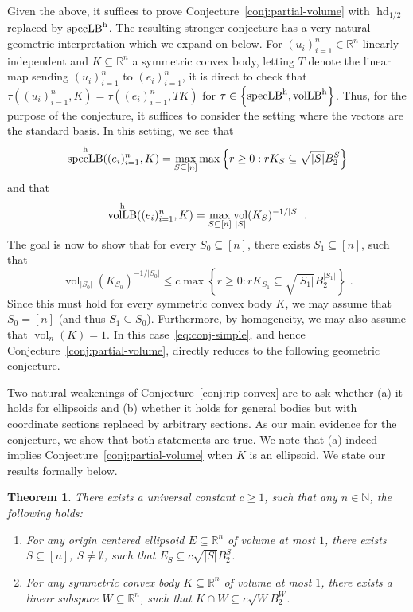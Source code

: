 \documentclass[11pt]{article}
\newtheorem{theorem}{Theorem}
\newtheorem{conjecture}[theorem]{Conjecture}
\newcommand{\R}{{\mathbb{R}}}
\newcommand{\N}{{\mathbb{N}}}
\newcommand{\set}[1]{\left\{ #1 \right\}}
\DeclareMathOperator{\vollb}{volLB}
\DeclareMathOperator{\hd}{hd}
\DeclareMathOperator{\vol}{vol}
\DeclareMathOperator{\speclb}{specLB}
\begin{document}
Given the above, it suffices to prove Conjecture~\ref{conj:partial-volume} with
$\hd_{1/2}$ replaced by $\speclb^{\rm h}$. The resulting stronger conjecture has a
very natural geometric interpretation which we expand on below. For
$(u_i)_{i=1}^n \in \R^n$ linearly independent and $K \subseteq \R^n$ a symmetric
convex body, letting $T$ denote the linear map sending $(u_i)_{i=1}^n$ to
$(e_i)_{i=1}^n$, it is direct to check that $\tau((u_i)_{i=1}^n,K) =
\tau((e_i)_{i=1}^n,TK)$ for $\tau \in \set{\speclb^{\rm h},\vollb^{\rm h}}$.
Thus, for the purpose of the conjecture, it suffices to consider the setting
where the vectors are the standard basis. In this setting, we see that
\[
\speclb^{\rm h}((e_i)_{i=1}^n,K) = \max_{S \subseteq [n]} \max \set{r \geq
0: r K_S \subseteq \sqrt{|S|} B_2^S} 
\]
and that 
\[
\vollb^{\rm h}((e_i)_{i=1}^n,K) = \max_{S \subseteq [n]}
\vol_{|S|}(K_S)^{-1/|S|} \text{ .} 
\]
The goal is now to show that for every $S_0 \subseteq [n]$, there exists $S_1
\subseteq [n]$, such that 
\begin{equation}
\label{eq:conj-simple}
\vol_{|S_0|}(K_{S_0})^{-1/|S_0|} \leq c \max \set{r \geq 0: r K_{S_1} \subseteq
\sqrt{|S_1|} B_2^{|S_1|}} \text{ .}
\end{equation}
Since this must hold for every symmetric convex body $K$, we may assume that
$S_0 = [n]$ (and thus $S_1 \subseteq S_0$). Furthermore, by homogeneity, we may
also assume that $\vol_n(K)=1$. In this case~\eqref{eq:conj-simple}, and hence
Conjecture~\ref{conj:partial-volume}, directly reduces to the following
geometric conjecture.

\ripconvex*

Two natural weakenings of Conjecture~\ref{conj:rip-convex} are to ask whether
(a) it holds for ellipsoids and (b) whether it holds for general bodies but with
coordinate sections replaced by arbitrary sections. As our main evidence for the
conjecture, we show that both statements are true. We note that (a) indeed
implies Conjecture~\ref{conj:partial-volume} when $K$ is an ellipsoid. We state
our results formally below.

\begin{theorem}
\label{thm:partial-conjecture}
There exists a universal constant $c \geq 1$, such that any $n \in \N$, the
following holds:
\begin{enumerate}
\item For any origin centered ellipsoid $E \subseteq \R^n$ of volume at most
$1$, there exists $S \subseteq [n]$, $S \neq \emptyset$, such that $E_S
\subseteq c \sqrt{|S|} B_2^S$.
\item For any symmetric convex body $K \subseteq \R^n$ of volume at most $1$,
there exists a linear subspace $W \subseteq \R^n$, such that $K \cap W \subseteq
c \sqrt{W} B_2^W$.
\end{enumerate}
\end{theorem}
\end{document}
